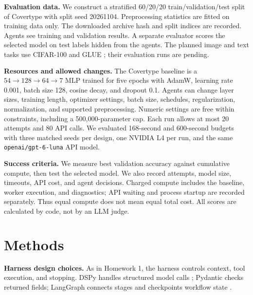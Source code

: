\documentclass{article}
\begin{document}
\textbf{Evaluation data.} We construct a stratified 60/20/20 train/validation/test split of Covertype with split seed 20261104. Preprocessing statistics are fitted on training data only. The downloaded archive hash and split indices are recorded. Agents see training and validation results. A separate evaluator scores the selected model on test labels hidden from the agents. The planned image and text tasks use CIFAR-100 and GLUE \citep{krizhevsky2009cifar,wang2019glue}; their evaluation runs are pending.

\textbf{Resources and allowed changes.} The Covertype baseline is a $54\!\rightarrow\!128\!\rightarrow\!64\!\rightarrow\!7$ MLP trained for five epochs with AdamW, learning rate 0.001, batch size 128, cosine decay, and dropout 0.1. Agents can change layer sizes, training length, optimizer settings, batch size, schedules, regularization, normalization, and supported preprocessing. Numeric settings are free within constraints, including a 500,000-parameter cap. Each run allows at most 20 attempts and 80 API calls. We evaluated 168-second and 600-second budgets with three matched seeds per design, one NVIDIA L4 per run, and the same \texttt{openai/gpt-6-luna} API model.

\textbf{Success criteria.} We measure best validation accuracy against cumulative compute, then test the selected model. We also record attempts, model size, timeouts, API cost, and agent decisions. Charged compute includes the baseline, worker execution, and diagnostics; API waiting and process startup are recorded separately. Thus equal compute does not mean equal total cost. All scores are calculated by code, not by an LLM judge.

\section{Methods}
\textbf{Harness design choices.} As in Homework 1, the harness controls context, tool execution, and stopping. DSPy handles structured model calls \citep{khattab2023dspy}; Pydantic checks returned fields; LangGraph connects stages and checkpoints workflow state \citep{langchain2026langgraph}.
\end{document}
